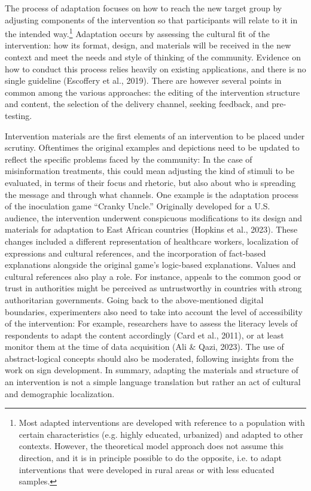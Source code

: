 \documentclass[authordate, reflection, issue]{jote-new-article}
\begin{document}
	The process of adaptation focuses on how to reach the new target group by adjusting components of the intervention so that participants will relate to it in the intended way.\footnote{Most adapted interventions are developed with reference to a population with certain characteristics (e.g. highly educated, urbanized) and adapted to other contexts. However, the theoretical model approach does not assume this direction, and it is in principle possible to do the opposite, i.e. to adapt interventions that were developed in rural areas or with less educated samples.} Adaptation occurs by assessing the cultural fit of the intervention: how its format, design, and materials will be received in the new context and meet the needs and style of thinking of the community. Evidence on how to conduct this process relies heavily on existing applications, and there is no single guideline (Escoffery et al., 2019). There are however several points in common among the various approaches: the editing of the intervention structure and content, the selection of the delivery channel, seeking feedback, and pre-testing.



	Intervention materials are the first elements of an intervention to be placed under scrutiny. Oftentimes the original examples and depictions need to be updated to reflect the specific problems faced by the community: In the case of misinformation treatments, this could mean adjusting the kind of stimuli to be evaluated, in terms of their focus and rhetoric, but also about who is spreading the message and through what channels. One example is the adaptation process of the inoculation game “Cranky Uncle.” Originally developed for a U.S. audience, the intervention underwent conspicuous modifications to its design and materials for adaptation to East African countries (Hopkins et al., 2023). These changes included a different representation of healthcare workers, localization of expressions and cultural references, and the incorporation of fact-based explanations alongside the original game's logic-based explanations. Values and cultural references also play a role. For instance, appeals to the common good or trust in authorities might be perceived as untrustworthy in countries with strong authoritarian governments. Going back to the above-mentioned digital boundaries, experimenters also need to take into account the level of accessibility of the intervention: For example, researchers have to assess the literacy levels of respondents to adapt the content accordingly (Card et al., 2011), or at least monitor them at the time of data acquisition (Ali \& Qazi, 2023). The use of abstract-logical concepts should also be moderated, following insights from the work on sign development. In summary, adapting the materials and structure of an intervention is not a simple language translation but rather an act of cultural and demographic localization.
\end{document}
